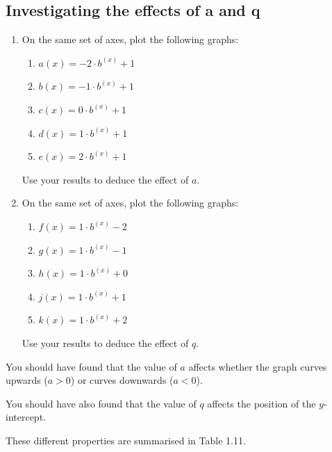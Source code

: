 \subsection*{ Investigating the effects of a and q}
\nopagebreak
\begin{enumerate}[noitemsep, label=\textbf{\arabic*}. ] 
\item On the same set of axes, plot the following graphs:
\begin{enumerate}[noitemsep, label=\textbf{\alph*}. ] 
\item $a(x)=-2\ensuremath{\cdot}{b}^{(x)}+1$
\item $b(x)=-1\ensuremath{\cdot}{b}^{(x)}+1$
\item $c(x)=0\ensuremath{\cdot}{b}^{(x)}+1$
\item $d(x)=1\ensuremath{\cdot}{b}^{(x)}+1$
\item $e(x)=2\ensuremath{\cdot}{b}^{(x)}+1$\end{enumerate}
Use your results to deduce the effect of $a$.
\item On the same set of axes, plot the following graphs:
\begin{enumerate}[noitemsep, label=\textbf{\alph*}. ] 
\item $f(x)=1\ensuremath{\cdot}{b}^{(x)}-2$
\item $g(x)=1\ensuremath{\cdot}{b}^{(x)}-1$
\item $h(x)=1\ensuremath{\cdot}{b}^{(x)}+0$
\item $j(x)=1\ensuremath{\cdot}{b}^{(x)}+1$
\item $k(x)=1\ensuremath{\cdot}{b}^{(x)}+2$\end{enumerate}
Use your results to deduce the effect of $q$.
\end{enumerate}
You should have found that the value of $a$ affects whether the graph curves upwards ($a>0$) or curves downwards ($a<0$).\par 
You should have also found that the value of $q$ affects the position of the $y$-intercept.\par 
These different properties are summarised in Table 1.11.\par 
